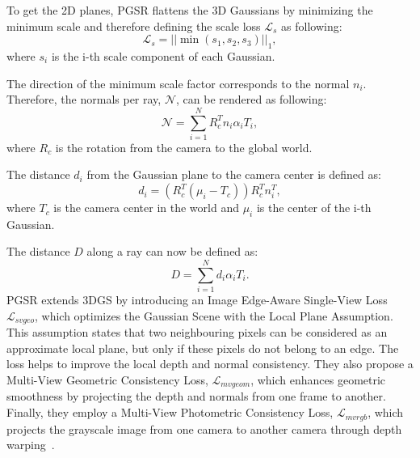 To get the 2D planes, PGSR flattens the 3D Gaussians by minimizing the minimum scale and therefore defining the scale loss $\mathcal{L}_s$ as following:
\begin{equation}
    \mathcal{L}_s = ||\min(s_1, s_2, s_3)||_1,
\end{equation}
where $s_i$ is the i-th scale component of each Gaussian.

The direction of the minimum scale factor corresponds to the normal $n_i$.
Therefore, the normals per ray, $\mathcal{N}$, can be rendered as following:
\begin{equation}
    \mathcal{N} = \sum_{i=1}^N R_c^T n_i \alpha_i T_i,
\end{equation}
where $R_c$ is the rotation from the camera to the global world.%

The distance $d_i$ from the Gaussian plane to the camera center is defined as:
\begin{equation}
    d_i = (R_c^T (\mu_i - T_c)) R_c^T n_i^T,
\end{equation}
where $T_c$ is the camera center in the world and $\mu_i$ is the center of the i-th Gaussian.

The distance $D$ along a ray can now be defined as:
\begin{equation}
    D = \sum_{i=1}^N d_i \alpha_i T_i.
\end{equation}
PGSR extends 3DGS by introducing an Image Edge-Aware Single-View Loss $\mathcal{L}_{svgeo}$, which optimizes the Gaussian Scene with the Local Plane Assumption. This assumption states that two neighbouring pixels can be considered as an approximate local plane, but only if these pixels do not belong to an edge. The loss helps to improve the local depth and normal consistency. They also propose a Multi-View Geometric Consistency Loss, $\mathcal{L}_{mvgeom}$, which enhances geometric smoothness by projecting the depth and normals from one frame to another. Finally, they employ a Multi-View Photometric Consistency Loss, $\mathcal{L}_{mvrgb}$, which projects the grayscale image from one camera to another camera through depth warping~\cite{pgsr2024}.

